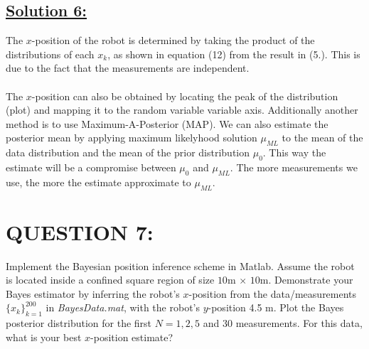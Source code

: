 \documentclass[a4paper,11pt]{article}
\begin{document}
\subsection*{\underline{Solution 6:}}
The $x$-position of the robot is determined by taking the product of the distributions of each $x_k$, as shown in equation (12) from the result in (5.). This is due to the fact that the measurements are independent.\\ \\
The $x$-position can also be obtained by locating the peak of the distribution (plot) and mapping it to the random variable variable axis. Additionally another method is to use Maximum-A-Posterior (MAP). We can also estimate the posterior mean by applying maximum likelyhood solution $\mu_{ML}$ to the mean of the data distribution and the mean of the prior distribution $\mu_0$. This way the estimate will be a compromise between $\mu_0$ and $\mu_{ML}$. The more measurements we use, the more the estimate approximate to $\mu_{ML}$.

\section{QUESTION 7:}
Implement the Bayesian position inference scheme in Matlab. Assume the robot is
located inside a confined square region of size $10$m $\times$ $10$m. Demonstrate your Bayes
estimator by inferring the robot’s $x$-position from the data/measurements $\{ x_k \}^{200} _{k = 1}$ in \emph{BayesData.mat}, with the robot’s $y$-position 4.5 m. Plot the Bayes posterior distribution for the first $N = 1, 2, 5$ and $30$ measurements. For this data, what is your best $x$-position estimate?
\end{document}
